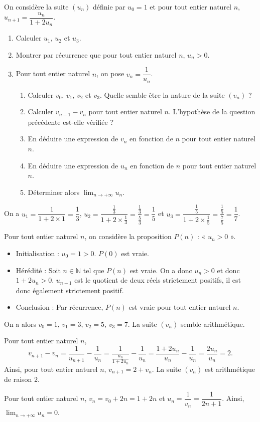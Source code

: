 \documentclass[11pt,fleqn]{book} %
\begin{document}
\begin{exercise}[topic=lim02]On considère la suite $(u_n)$ définie par $u_0=1$ et pour tout entier naturel $n$, $u_{n+1}=\dfrac{u_n}{1+2u_n}$.

\begin{enumerate}
\item Calculer $u_1$, $u_2$ et $u_3$.
\item Montrer par récurrence que pour tout entier naturel $n$, $u_n >0$.
\item Pour tout entier naturel $n$, on pose $v_n=\dfrac{1}{u_n}$.
\begin{enumerate}
\item Calculer $v_0$, $v_1$, $v_2$ et $v_3$. Quelle semble être la nature de la suite $(v_n)$ ?
\item Calculer $v_{n+1}-v_n$ pour tout entier naturel $n$. L'hypothèse de la question précédente est-elle vérifiée ?
\item En déduire une expression de $v_n$ en fonction de $n$ pour tout entier naturel $n$.
\item En déduire une expression de $u_n$ en fonction de $n$ pour tout entier naturel $n$.
\item Déterminer alors $\displaystyle\lim_{n \to +\infty}u_n$.
\end{enumerate}
\end{enumerate}\end{exercise}
\begin{solution}

On a $u_1=\dfrac{1}{1+2\times 1} = \dfrac{1}{3}$, $u_2=\dfrac{\frac{1}{3}}{1+2 \times \frac{1}{3}}=\dfrac{\frac{1}{3}}{\frac{5}{3}}=\dfrac{1}{5}$ et $u_3=\dfrac{\frac{1}{5}}{1+2 \times \frac{1}{5}}=\dfrac{\frac{1}{5}}{\frac{7}{5}}=\dfrac{1}{7}$.

Pour tout entier naturel $n$, on considère la proposition $P(n)$ : « $u_n >0$ ».
\begin{itemize}
\item Initialisation : $u_0=1>0$. $P(0)$ est vraie.
\item Hérédité : Soit $n\in \mathbb{N}$ tel que $P(n)$ est vraie. On a donc $u_n>0$ et donc $1+2u_n>0$. $u_{n+1}$ est le quotient de deux réels strictement positifs, il est donc également strictement positif.
\item Conclusion : Par récurrence, $P(n)$ est vraie pour tout entier naturel $n$.
\end{itemize}

On a alors $v_0=1$, $v_1=3$, $v_2=5$, $v_3=7$. La suite $(v_n)$ semble arithmétique.

Pour tout entier naturel $n$,
\[v_{n+1}-v_n=\dfrac{1}{u_{n+1}}-\dfrac{1}{u_n}=\dfrac{1}{\frac{u_n}{1+2u_n}}-\frac{1}{u_n}=\dfrac{1+2u_n}{u_n}-\dfrac{1}{u_n}=\dfrac{2u_n}{u_n}=2.\]
Ainsi, pour tout entier naturel $n$, $v_{n+1}=2+v_n$. La suite $(v_n)$ est arithmétique de raison 2.

Pour tout entier naturel  $n$, $v_n=v_0+2n=1+2n$ et $u_n=\dfrac{1}{v_n}=\dfrac{1}{2n+1}$. Ainsi, $\displaystyle\lim_{n \to +\infty}u_n=0$.

\end{solution}
\end{document}
